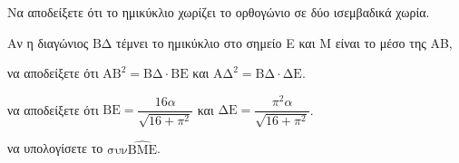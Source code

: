\begin{alist}
    \item Να αποδείξετε ότι το ημικύκλιο χωρίζει το ορθογώνιο σε δύο ισεμβαδικά χωρία. 
    \item Αν η διαγώνιος ΒΔ τέμνει το ημικύκλιο στο σημείο Ε και Μ είναι το μέσο της ΑΒ,
    \begin{rlist}
        \item να αποδείξετε ότι $\text{AB}^2 = \text{BΔ} \cdot \text{BE}$ και $\text{AΔ}^2 = \text{BΔ} \cdot \text{ΔE}$. 
        \item να αποδείξετε ότι $\text{BE} = \dfrac{16\alpha}{\sqrt{16+\pi^2}}$ και $\text{ΔE} = \dfrac{\pi^2\alpha}{\sqrt{16+\pi^2}}$. 
        \item να υπολογίσετε το $\text{συν}\widehat{\text{BME}}$. 
    \end{rlist}
\end{alist}